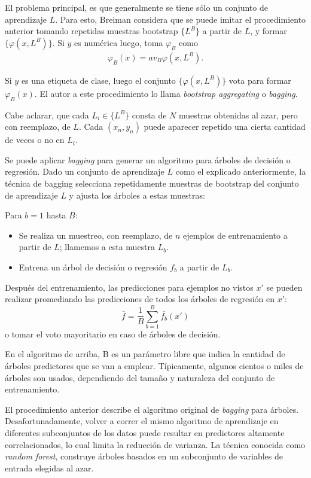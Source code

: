 	El problema principal, es que generalmente se tiene sólo un conjunto de aprendizaje $L$. Para esto, Breiman considera que se puede imitar el procedimiento anterior tomando repetidas muestras bootstrap $\{ L^{B} \}$ a partir de $L$, y formar $\{ \varphi(x, L^{B}) \}$. Si $y$ es numérica luego, toma $\varphi_B$ como
	\begin{align*}
		\varphi_B(x) = av_B\varphi(x,L^{B}).
	\end{align*}
	
	Si $y$ es una etiqueta de clase, luego el conjunto  $\{ \varphi(x, L^{B}) \}$ vota para formar $\varphi_B(x)$. El autor a este procedimiento lo llama  \textit{bootstrap aggregating} o \textit{bagging}.
	
	Cabe aclarar, que cada $L_i \in \{ L^{B} \}$ consta de $N$ muestras obtenidas al azar, pero con reemplazo, de $L$. Cada $(x_n, y_n)$ puede aparecer repetido una cierta cantidad de veces o no en $L_i$.
	
	Se puede aplicar \textit{bagging} para generar un algoritmo para árboles de decisión o regresión. Dado un conjunto de aprendizaje $L$ como el explicado anteriormente, la técnica de bagging selecciona repetidamente muestras de bootstrap del conjunto de aprendizaje $L$ y ajusta los árboles a estas muestras:

	Para $b=1$ hasta $B$:
	\begin{itemize}
		\item Se realiza un muestreo, con reemplazo, de $n$ ejemplos de entrenamiento a partir de $L$; llamemos a esta muestra $L_b$.
		\item Entrena un árbol de decisión o regresión $f_b$ a partir de $L_b$.
	\end{itemize}
	
	Después del entrenamiento, las predicciones para ejemplos no vistos $x'$ se pueden realizar promediando las predicciones de todos los árboles de regresión en $x'$:
	$$\bar{f} = \frac{1}{B}\sum_{b=1}^B\bar{f_b}(x')$$
	o tomar el voto mayoritario en caso de árboles de decisión.
	
	En el algoritmo de arriba, B es un parámetro libre que indica la cantidad de árboles predictores que se van a emplear. Típicamente, algunos cientos o miles de árboles son usados, dependiendo del tamaño y naturaleza del conjunto de entrenamiento.
			
	El procedimiento anterior describe el algoritmo original de \textit{bagging} para árboles. Desafortunadamente, volver a correr el mismo algoritmo de aprendizaje en diferentes subconjuntos de los datos puede resultar en predictores altamente correlacionados, lo cual limita la reducción de varianza. La técnica conocida como \textit{random forest}, construye árboles basados en un subconjunto de variables de entrada elegidas al azar. 
		
